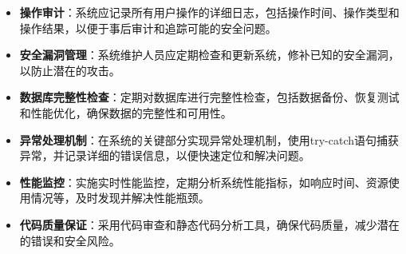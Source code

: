 \documentclass[12pt]{article}
\begin{document}
\begin{itemize}
    \item \textbf{操作审计}：系统应记录所有用户操作的详细日志，包括操作时间、操作类型和操作结果，以便于事后审计和追踪可能的安全问题。
    \item \textbf{安全漏洞管理}：系统维护人员应定期检查和更新系统，修补已知的安全漏洞，以防止潜在的攻击。
    \item \textbf{数据库完整性检查}：定期对数据库进行完整性检查，包括数据备份、恢复测试和性能优化，确保数据的完整性和可用性。
    \item \textbf{异常处理机制}：在系统的关键部分实现异常处理机制，使用try-catch语句捕获异常，并记录详细的错误信息，以便快速定位和解决问题。
    \item \textbf{性能监控}：实施实时性能监控，定期分析系统性能指标，如响应时间、资源使用情况等，及时发现并解决性能瓶颈。
    \item \textbf{代码质量保证}：采用代码审查和静态代码分析工具，确保代码质量，减少潜在的错误和安全风险。
\end{itemize}
\end{document}
